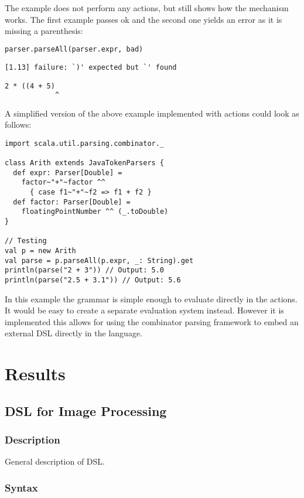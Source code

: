 \documentclass[a4paper,english]{report}
\begin{document}
The example does not perform any actions, but still shows how the
mechanism works. The first example passes ok and the second one yields
an error as it is missing a parenthesis:

\begin{lstlisting}[language=tex]
parser.parseAll(parser.expr, bad)

[1.13] failure: `)' expected but `' found

2 * ((4 + 5)
            ^
\end{lstlisting}

A simplified version of the above example implemented with actions
could look as follows:

\begin{lstlisting}
import scala.util.parsing.combinator._

class Arith extends JavaTokenParsers {
  def expr: Parser[Double] =
    factor~"+"~factor ^^ 
      { case f1~"+"~f2 => f1 + f2 }
  def factor: Parser[Double] =
    floatingPointNumber ^^ (_.toDouble)
}

// Testing
val p = new Arith
val parse = p.parseAll(p.expr, _: String).get
println(parse("2 + 3")) // Output: 5.0
println(parse("2.5 + 3.1")) // Output: 5.6
\end{lstlisting}

In this example the grammar is simple enough to evaluate directly in
the actions. It would be easy to create a separate evaluation system
instead. However it is implemented this allows for using the
combinator parsing framework to embed an external DSL directly in the
language.

\chapter{Results}

\section{DSL for Image Processing}

\subsection{Description}

General description of DSL.

\subsection{Syntax}
\end{document}
